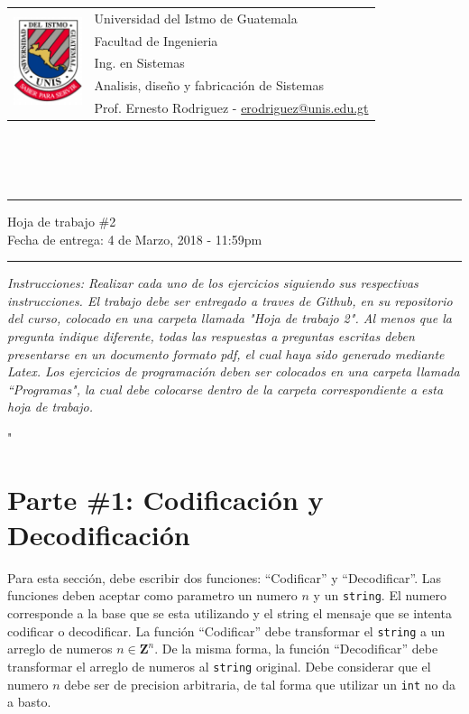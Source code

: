 \documentclass{article}
\newcommand{\horrule}[1]{\rule{\linewidth}{#1}}
\newcommand{\perlscript}[2]{
\begin{itemize}
\item[]
\end{itemize}
}
\begin{document}
\begin{tabular}{l l}
\multirow{5}{*}{\includegraphics[width=2cm]{../../Recursos/logo.png}} & Universidad del Istmo de Guatemala \\
 & Facultad de Ingenieria \\
 & Ing. en Sistemas \\
 & Analisis, dise\~no y fabricaci\'on de Sistemas \\
 & Prof. Ernesto Rodriguez - \href{mailto:erodriguez@unis.edu.gt}{erodriguez@unis.edu.gt} \\
\end{tabular}
\\\\\\

\begin{center}
        \horrule{0.5pt}
        \huge{Hoja de trabajo \#2} \\
        \large{Fecha de entrega: 4 de Marzo, 2018 - 11:59pm} \\
        \horrule{1pt}
\end{center}

\emph{Instrucciones: Realizar cada uno de los ejercicios siguiendo sus respectivas
instrucciones. El trabajo debe ser entregado a traves de Github, en su repositorio del curso, colocado
en una carpeta llamada "Hoja de trabajo 2". Al menos que la pregunta indique diferente, todas las
respuestas a preguntas escritas deben presentarse en un documento formato pdf, el cual haya 
sido generado mediante Latex. Los ejercicios de programaci\'on deben ser colocados en una carpeta
llamada ``Programas", la cual debe colocarse dentro de la carpeta correspondiente a esta hoja de trabajo.}

"
\section*{Parte \#1: Codificaci\'on y Decodificaci\'on}
Para esta secci\'on, debe escribir dos funciones: ``Codificar''
y ``Decodificar''. Las funciones deben aceptar como parametro un
numero $n$ y un \texttt{string}. El numero corresponde a la base
que se esta utilizando y el string el mensaje que se intenta
codificar o decodificar. La funci\'on ``Codificar'' debe transformar
el \texttt{string} a un arreglo de numeros $n\in\mathbf{Z}^n$. De
la misma forma, la funci\'on ``Decodificar'' debe transformar el
arreglo de numeros al \texttt{string} original. Debe considerar que
el numero $n$ debe ser de precision arbitraria, de tal forma que utilizar
un \texttt{int} no da a basto.
\end{document}
